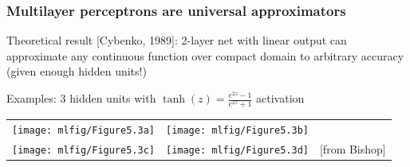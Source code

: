 \documentclass[xcolor=dvipsnames]{beamer}
\begin{document}
\begin{frame}
  \frametitle{Multilayer perceptrons are universal approximators}
\bi\item Theoretical result [Cybenko, 1989]: 2-layer net with linear
output can approximate any continuous function over compact
domain to arbitrary accuracy (given enough hidden units!)
\item Examples: 3 hidden units with $\tanh(z)=\frac{e^{2z}-1}{e^{2z}+1}$
  activation
\ei
  \begin{tabular}{ccc}
    \texttt{[image: mlfig/Figure5.3a]}&
    \texttt{[image: mlfig/Figure5.3b]}&\\
    \texttt{[image: mlfig/Figure5.3c]}&
    \texttt{[image: mlfig/Figure5.3d]}&{\small [from Bishop]}
  \end{tabular}
\end{frame}
\end{document}
